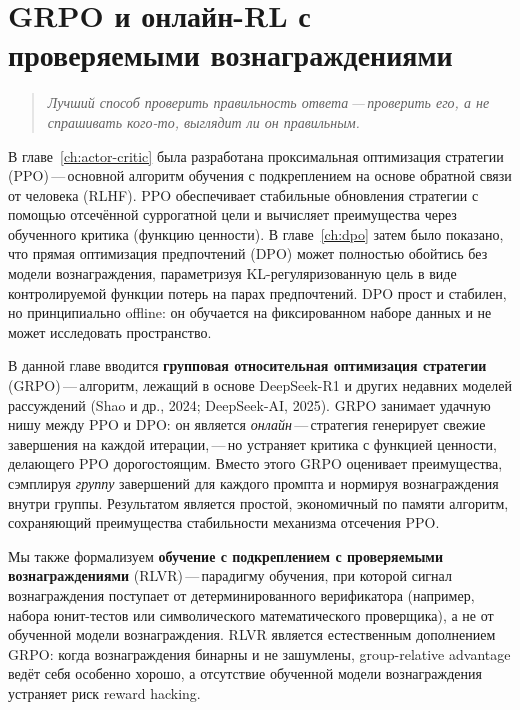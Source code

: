 \chapter[GRPO и онлайн-RL]{GRPO и онлайн-RL с проверяемыми вознаграждениями}
\label{ch:grpo}

\begin{quote}
\itshape
Лучший способ проверить правильность ответа\,---\,проверить его, а не спрашивать кого-то, выглядит ли он правильным.
\end{quote}

\bigskip

В главе~\ref{ch:actor-critic} была разработана проксимальная оптимизация стратегии (PPO)\,---\,основной алгоритм обучения с подкреплением на основе обратной связи от человека (RLHF). PPO обеспечивает стабильные обновления стратегии с помощью отсечённой суррогатной цели и вычисляет преимущества через обученного критика (функцию ценности). В главе~\ref{ch:dpo} затем было показано, что прямая оптимизация предпочтений (DPO) может полностью обойтись без модели вознаграждения, параметризуя KL-регуляризованную цель в виде контролируемой функции потерь на парах предпочтений. DPO прост и стабилен, но принципиально offline: он обучается на фиксированном наборе данных и не может исследовать пространство.

В данной главе вводится \textbf{групповая относительная оптимизация стратегии} (GRPO)\,---\,алгоритм, лежащий в основе DeepSeek-R1 и других недавних моделей рассуждений (Shao и др., 2024; DeepSeek-AI, 2025). GRPO занимает удачную нишу между PPO и DPO: он является \emph{онлайн}\,---\,стратегия генерирует свежие завершения на каждой итерации,\,---\,но устраняет критика с функцией ценности, делающего PPO дорогостоящим. Вместо этого GRPO оценивает преимущества, сэмплируя \emph{группу} завершений для каждого промпта и нормируя вознаграждения внутри группы. Результатом является простой, экономичный по памяти алгоритм, сохраняющий преимущества стабильности механизма отсечения PPO.

Мы также формализуем \textbf{обучение с подкреплением с проверяемыми вознаграждениями} (RLVR)\,---\,парадигму обучения, при которой сигнал вознаграждения поступает от детерминированного верификатора (например, набора юнит-тестов или символического математического проверщика), а не от обученной модели вознаграждения. RLVR является естественным дополнением GRPO: когда вознаграждения бинарны и не зашумлены, group-relative advantage ведёт себя особенно хорошо, а отсутствие обученной модели вознаграждения устраняет риск reward hacking.

